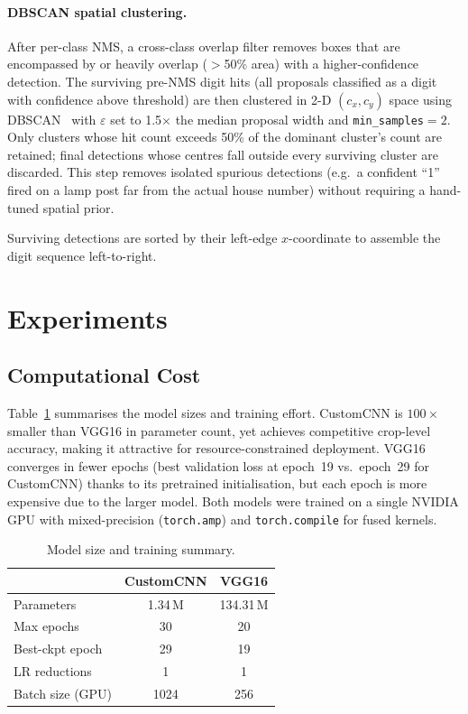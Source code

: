 \documentclass[10pt,twocolumn]{article}
\begin{document}
\paragraph{DBSCAN spatial clustering.}
After per-class NMS, a cross-class overlap filter removes boxes that are
encompassed by or heavily overlap ($>$50\% area) with a higher-confidence
detection.
The surviving pre-NMS digit hits (all proposals classified as a digit with
confidence above threshold) are then clustered in 2-D $(c_x, c_y)$ space
using DBSCAN~\cite{ester1996dbscan} with $\varepsilon$ set to 1.5$\times$
the median proposal width and \texttt{min\_samples}$=2$.
Only clusters whose hit count exceeds 50\% of the dominant cluster's count
are retained; final detections whose centres fall outside every surviving
cluster are discarded.
This step removes isolated spurious detections (e.g.\ a confident ``1''
fired on a lamp post far from the actual house number) without requiring a
hand-tuned spatial prior.

Surviving detections are sorted by their left-edge $x$-coordinate to
assemble the digit sequence left-to-right.

\section{Experiments}

\subsection{Computational Cost}

Table~\ref{tab:cost} summarises the model sizes and training effort.
CustomCNN is $100\times$ smaller than VGG16 in parameter count, yet
achieves competitive crop-level accuracy, making it attractive for
resource-constrained deployment.
VGG16 converges in fewer epochs (best validation loss at epoch~19 vs.\
epoch~29 for CustomCNN) thanks to its pretrained initialisation, but each
epoch is more expensive due to the larger model.
Both models were trained on a single NVIDIA GPU with mixed-precision
(\texttt{torch.amp}) and \texttt{torch.compile} for fused kernels.

\begin{table}[H]
  \centering
  \caption{Model size and training summary.}
  \label{tab:cost}
  \begin{tabular}{lcc}
    \toprule
    & CustomCNN & VGG16 \\
    \midrule
    Parameters          & 1.34\,M   & 134.31\,M \\
    Max epochs          & 30        & 20        \\
    Best-ckpt epoch     & 29        & 19        \\
    LR reductions       & 1         & 1         \\
    Batch size (GPU)    & 1024      & 256       \\
    \bottomrule
  \end{tabular}
\end{table}
\end{document}

